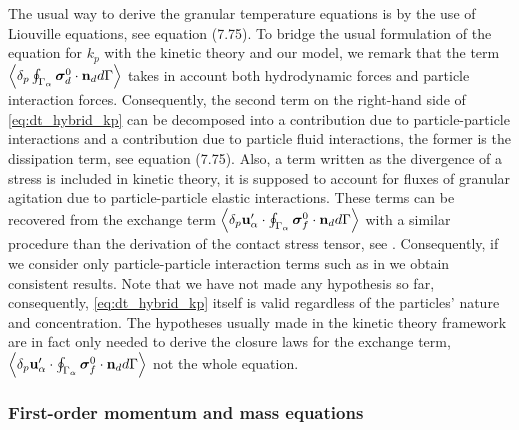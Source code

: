 The usual way to derive the granular temperature equations is by the use of Liouville equations, see \citet[Chapter 7 and 9]{rao2008introduction} equation (7.75). 
To bridge the usual formulation of the equation for $k_p$ with the kinetic theory and our model, we remark that the term $\left<\delta_p \oint_{\Gamma_{\alpha}} \bm{\sigma}_d^0 \cdot \textbf{n}_d d\Gamma\right>$ takes in account both hydrodynamic forces and particle interaction forces. 
Consequently, the second term on the right-hand side of \ref{eq:dt_hybrid_kp} can be decomposed into a contribution due to particle-particle interactions and a contribution due to particle fluid interactions, the former is the dissipation term, see \citet[Chapter 7 and 9]{rao2008introduction} equation (7.75). 
Also, a term written as the divergence of a stress is included in kinetic theory, it is supposed to account for fluxes of granular agitation due to particle-particle elastic interactions. 
These terms can be recovered from the exchange term $\left<\delta_p \textbf{u}_\alpha'\cdot\oint_{\Gamma_{\alpha}} \bm{\sigma}_f^0 \cdot \textbf{n}_d d\Gamma\right>$ with a similar procedure than the derivation of the contact stress tensor, see \citet{scorsim2021particle}. 
Consequently, if we consider only particle-particle interaction terms such as in \citet{rao2008introduction} we obtain consistent results. 
Note that we have not made any hypothesis so far, consequently, \ref{eq:dt_hybrid_kp} itself is valid regardless of the particles' nature and concentration.
The hypotheses usually made in the kinetic theory framework are in fact only needed to derive the closure laws for the exchange term, $\left<\delta_p \textbf{u}_\alpha'\cdot\oint_{\Gamma_{\alpha}} \bm{\sigma}_f^0 \cdot \textbf{n}_d d\Gamma\right>$ not the whole equation. 

\subsubsection{First-order momentum and mass equations}

